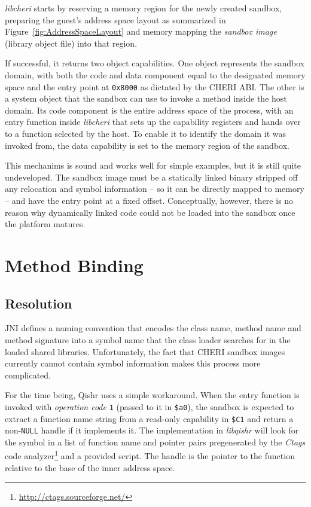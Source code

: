 \documentclass[a4paper,12pt,twoside,openright]{report}
\newcommand{\reg}[1]{\texttt{\$#1}}
\newcommand{\tool}[1]{\emph{#1}}
\newcommand{\lib}[1]{\tool{lib#1}}
\begin{document}
\lib{cheri} starts by reserving a memory region for the newly created sandbox, preparing the guest's address space layout as summarized in Figure~\ref{fig:AddressSpaceLayout} and memory mapping the \emph{sandbox image} (library object file) into that region. \label{sec:AddressSpaceLayout}

If successful, it returns two object capabilities. One object represents the sandbox domain, with both the code and data component equal to the designated memory space and the entry point at \texttt{0x8000} as dictated by the CHERI ABI. \label{sec:SystemObject} The other is a system object that the sandbox can use to invoke a method inside the host domain. Its code component is the entire address space of the process, with an entry function inside \lib{cheri} that sets up the capability registers and hands over to a function selected by the host. To enable it to identify the domain it was invoked from, the data capability is set to the memory region of the sandbox. 

This mechanims is sound and works well for simple examples, but it is still quite undeveloped. The sandbox image must be a statically linked binary stripped off any relocation and symbol information -- so it can be directly mapped to memory -- and have the entry point at a fixed offset. Conceptually, however, there is no reason why dynamically linked code could not be loaded into the sandbox once the platform matures.

\section{Method Binding}

\subsection{Resolution}

JNI defines a naming convention that encodes the class name, method name and method signature into a symbol name that the class loader searches for in the loaded shared libraries. Unfortunately, the fact that CHERI sandbox images currently cannot contain symbol information makes this process more complicated.

For the time being, Qishr uses a simple workaround. When the entry function is invoked with \emph{operation code} \texttt{1} (passed to it in \reg{a0}), the sandbox is expected to extract a function name string from a read-only capability in \reg{C1} and return a non-\texttt{NULL} handle if it implements it. The implementation in \lib{qishr} will look for the symbol in a list of function name and pointer pairs pregenerated by the \tool{Ctags} code analyzer\footnote{\url{http://ctags.sourceforge.net/}} and a provided script. The handle is the pointer to the function relative to the base of the inner address space.
\end{document}

